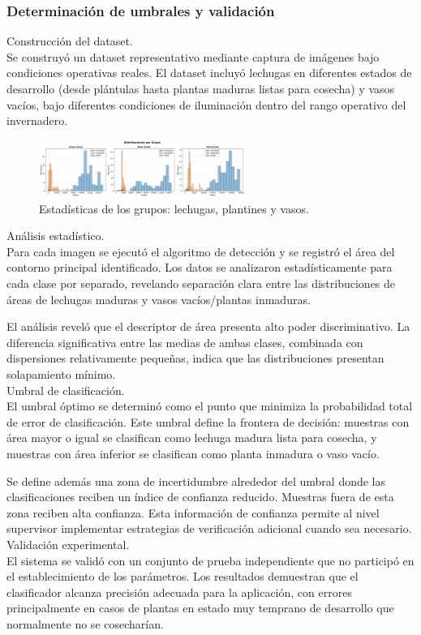 \subsubsection{Determinación de umbrales y validación}

Construcción del dataset.\\
\noindent
Se construyó un dataset representativo mediante captura de imágenes bajo condiciones operativas reales. El dataset incluyó lechugas en diferentes estados de desarrollo (desde plántulas hasta plantas maduras listas para cosecha) y vasos vacíos, bajo diferentes condiciones de iluminación dentro del rango operativo del invernadero.

\begin{figure}[H]
    \centering
    \includegraphics[width=0.6\textwidth]{img/distribuciones.png}
    \caption{Estadísticas de los grupos: lechugas, plantines y vasos.}
    \label{fig:distribuciones}
\end{figure}

Análisis estadístico.\\
\noindent
Para cada imagen se ejecutó el algoritmo de detección y se registró el área del contorno principal identificado. Los datos se analizaron estadísticamente para cada clase por separado, revelando separación clara entre las distribuciones de áreas de lechugas maduras y vasos vacíos/plantas inmaduras.

El análisis reveló que el descriptor de área presenta alto poder discriminativo. La diferencia significativa entre las medias de ambas clases, combinada con dispersiones relativamente pequeñas, indica que las distribuciones presentan solapamiento mínimo.\\

Umbral de clasificación.\\
\noindent
El umbral óptimo se determinó como el punto que minimiza la probabilidad total de error de clasificación. Este umbral define la frontera de decisión: muestras con área mayor o igual se clasifican como lechuga madura lista para cosecha, y muestras con área inferior se clasifican como planta inmadura o vaso vacío.

Se define además una zona de incertidumbre alrededor del umbral donde las clasificaciones reciben un índice de confianza reducido. Muestras fuera de esta zona reciben alta confianza. Esta información de confianza permite al nivel supervisor implementar estrategias de verificación adicional cuando sea necesario.\\

Validación experimental.\\
\noindent
El sistema se validó con un conjunto de prueba independiente que no participó en el establecimiento de los parámetros. Los resultados demuestran que el clasificador alcanza precisión adecuada para la aplicación, con errores principalmente en casos de plantas en estado muy temprano de desarrollo que normalmente no se cosecharían.
